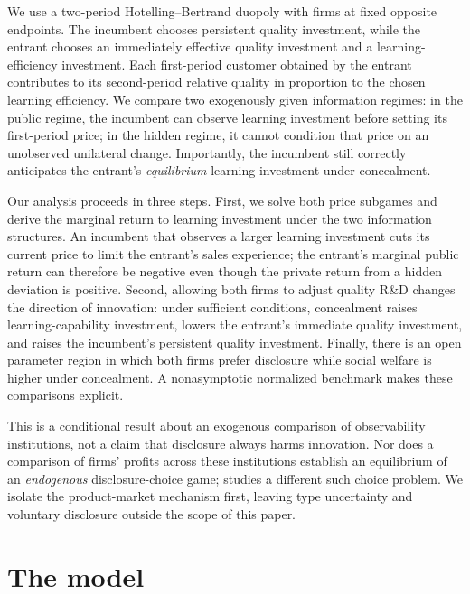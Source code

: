 \documentclass[11pt,a4paper]{article}
\numberwithin{equation}{section}
\theoremstyle{remark}
\begin{document}
We use a two-period Hotelling--Bertrand duopoly with firms at fixed opposite endpoints. The incumbent chooses persistent quality investment, while the entrant chooses an immediately effective quality investment and a learning-efficiency investment. Each first-period customer obtained by the entrant contributes to its second-period relative quality in proportion to the chosen learning efficiency. We compare two exogenously given information regimes: in the public regime, the incumbent can observe learning investment before setting its first-period price; in the hidden regime, it cannot condition that price on an unobserved unilateral change. Importantly, the incumbent still correctly anticipates the entrant's \emph{equilibrium} learning investment under concealment.

Our analysis proceeds in three steps. First, we solve both price subgames and derive the marginal return to learning investment under the two information structures. An incumbent that observes a larger learning investment cuts its current price to limit the entrant's sales experience; the entrant's marginal public return can therefore be negative even though the private return from a hidden deviation is positive. Second, allowing both firms to adjust quality R\&D changes the direction of innovation: under sufficient conditions, concealment raises learning-capability investment, lowers the entrant's immediate quality investment, and raises the incumbent's persistent quality investment. Finally, there is an open parameter region in which both firms prefer disclosure while social welfare is higher under concealment. A nonasymptotic normalized benchmark makes these comparisons explicit.

This is a conditional result about an exogenous comparison of observability institutions, not a claim that disclosure always harms innovation. Nor does a comparison of firms' profits across these institutions establish an equilibrium of an \emph{endogenous} disclosure-choice game; \citet{BaikKim2025} studies a different such choice problem. We isolate the product-market mechanism first, leaving type uncertainty and voluntary disclosure outside the scope of this paper.

\section{The model}\label{sec:model}
\end{document}
